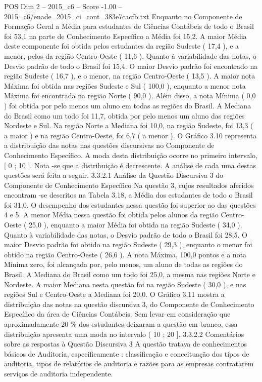 \begin{textsample}{POS Dim 2 – 2015\_c6 – Score -1.00 – 2015\_c6/enade\_2015\_ci\_cont\_383e7cacfb.txt}
Enquanto no Componente de Formação Geral a Média para estudantes de Ciências Contábeis de todo o Brasil foi 53,1 na parte de Conhecimento Específico a Média foi 15,2.
A maior Média deste componente foi obtida pelos estudantes da região Sudeste ( 17,4 ), e a menor, pelos da região Centro-Oeste ( 11,6 ).
Quanto à variabilidade das notas, o Desvio padrão de todo o Brasil foi 15,4.
O maior Desvio padrão foi encontrado na região Sudeste ( 16,7 ), e o menor, na região Centro-Oeste ( 13,5 ).
A maior nota Máxima foi obtida nas regiões Sudeste e Sul ( 100,0 ), enquanto a menor nota Máxima foi encontrada na região Norte ( 90,0 ).
Além disso, a nota Mínima ( 0,0 ) foi obtida por pelo menos um aluno em todas as regiões do Brasil.
A Mediana do Brasil como um todo foi 11,7, obtida por pelo menos um aluno das regiões Nordeste e Sul.
Na região Norte a Mediana foi 10,0, na região Sudeste, foi 13,3 ( a maior ) e na região Centro-Oeste, foi 6,7 ( a menor ).
O Gráfico 3.10 representa a distribuição das notas nas questões discursivas no Componente de Conhecimento Específico.
A moda desta distribuição ocorre no primeiro intervalo, [ 0 ; 10 ].
Nota -se que a distribuição é decrescente.
A análise de cada uma destas questões será feita a seguir. 3.3.2.1 Análise da Questão Discursiva 3 do Componente de Conhecimento Específico Na questão 3, cujos resultados aferidos encontram -se descritos na Tabela 3.18, a Média dos estudantes de todo o Brasil foi 31,0.
O desempenho dos estudantes nessa questão foi superior ao das questões 4 e 5.
A menor Média nessa questão foi obtida pelos alunos da região Centro-Oeste ( 25,0 ), enquanto a maior Média foi obtida na região Sudeste ( 34,0 ).
Quanto à variabilidade das notas, o Desvio padrão de todo o Brasil foi 28,5.
O maior Desvio padrão foi obtido na região Sudeste ( 29,3 ), enquanto o menor foi obtido na região Centro-Oeste ( 26,6 ).
A nota Máxima, 100,0 pontos e a nota Mínima zero, foi alcançada por, pelo menos, um aluno de todas as regiões do Brasil.
A Mediana do Brasil como um todo foi 25,0, a mesma nas regiões Norte e Nordeste.
A maior Mediana nesta questão foi na região Sudeste ( 30,0 ), e nas regiões Sul e Centro-Oeste a Mediana foi 20,0.
O Gráfico 3.11 mostra a distribuição das notas na questão discursiva 3, do Componente de Conhecimento Específico da área de Ciências Contábeis.
Sem levar em consideração que aproximadamente 20 \% dos estudantes deixaram a questão em branco, essa distribuição apresenta uma moda no intervalo ( 10 ; 20 ]. 3.3.2.2 Comentários sobre as respostas à Questão Discursiva 3 A questão tratava de conhecimentos básicos de Auditoria, especificamente : classificação e conceituação dos tipos de auditoria, tipos de relatórios de auditoria e razões para as empresas contratarem serviços de auditoria independente.

\end{textsample}
